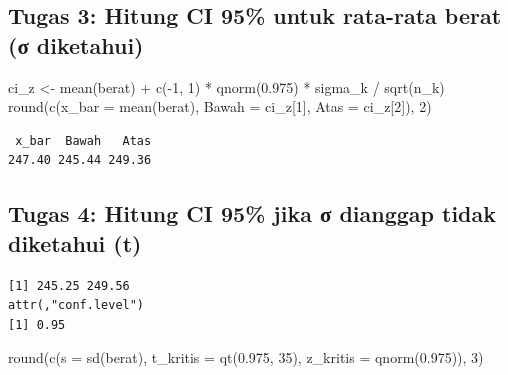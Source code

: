 \documentclass[
  indonesian,
  letterpaper,
]{book}
\newenvironment{Shaded}{\begin{snugshade}}{\end{snugshade}}
\newcommand{\AttributeTok}[1]{\textcolor[rgb]{0.40,0.45,0.13}{#1}}
\newcommand{\DecValTok}[1]{\textcolor[rgb]{0.68,0.00,0.00}{#1}}
\newcommand{\FloatTok}[1]{\textcolor[rgb]{0.68,0.00,0.00}{#1}}
\newcommand{\FunctionTok}[1]{\textcolor[rgb]{0.28,0.35,0.67}{#1}}
\newcommand{\NormalTok}[1]{\textcolor[rgb]{0.00,0.23,0.31}{#1}}
\newcommand{\OtherTok}[1]{\textcolor[rgb]{0.00,0.23,0.31}{#1}}
\newcommand{\SpecialCharTok}[1]{\textcolor[rgb]{0.37,0.37,0.37}{#1}}
\begin{document}
\subsection{Tugas 3: Hitung CI 95\% untuk rata-rata berat (σ
diketahui)}\label{tugas-3-hitung-ci-95-untuk-rata-rata-berat-ux3c3-diketahui}

\begin{Shaded}
\begin{Highlighting}[]
\NormalTok{ci\_z }\OtherTok{\textless{}{-}} \FunctionTok{mean}\NormalTok{(berat) }\SpecialCharTok{+} \FunctionTok{c}\NormalTok{(}\SpecialCharTok{{-}}\DecValTok{1}\NormalTok{, }\DecValTok{1}\NormalTok{) }\SpecialCharTok{*} \FunctionTok{qnorm}\NormalTok{(}\FloatTok{0.975}\NormalTok{) }\SpecialCharTok{*}\NormalTok{ sigma\_k }\SpecialCharTok{/} \FunctionTok{sqrt}\NormalTok{(n\_k)}
\FunctionTok{round}\NormalTok{(}\FunctionTok{c}\NormalTok{(}\AttributeTok{x\_bar =} \FunctionTok{mean}\NormalTok{(berat), }\AttributeTok{Bawah =}\NormalTok{ ci\_z[}\DecValTok{1}\NormalTok{], }\AttributeTok{Atas =}\NormalTok{ ci\_z[}\DecValTok{2}\NormalTok{]), }\DecValTok{2}\NormalTok{)}
\end{Highlighting}
\end{Shaded}

\begin{verbatim}
 x_bar  Bawah   Atas 
247.40 245.44 249.36 
\end{verbatim}

\subsection{Tugas 4: Hitung CI 95\% jika σ dianggap tidak diketahui
(t)}\label{tugas-4-hitung-ci-95-jika-ux3c3-dianggap-tidak-diketahui-t}

\begin{Shaded}
\end{Shaded}

\begin{verbatim}
[1] 245.25 249.56
attr(,"conf.level")
[1] 0.95
\end{verbatim}

\begin{Shaded}
\begin{Highlighting}[]
\FunctionTok{round}\NormalTok{(}\FunctionTok{c}\NormalTok{(}\AttributeTok{s =} \FunctionTok{sd}\NormalTok{(berat), }\AttributeTok{t\_kritis =} \FunctionTok{qt}\NormalTok{(}\FloatTok{0.975}\NormalTok{, }\DecValTok{35}\NormalTok{), }\AttributeTok{z\_kritis =} \FunctionTok{qnorm}\NormalTok{(}\FloatTok{0.975}\NormalTok{)), }\DecValTok{3}\NormalTok{)}
\end{Highlighting}
\end{Shaded}
\end{document}
